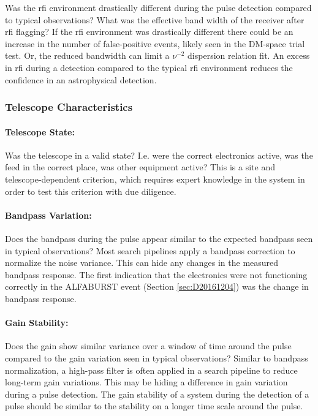 \documentclass[a4paper,fleqn,usenatbib]{mnras}
\begin{document}
Was the \gls{rfi} environment drastically different during the pulse detection
compared to typical observations? What was the effective band width of the
receiver after \gls{rfi} flagging? If the \gls{rfi} environment was drastically
different there could be an increase in the number of false-positive events,
likely seen in the DM-space trial test. Or, the reduced bandwidth can limit a
$\nu^{-2}$ dispersion relation fit. An excess in \gls{rfi} during a detection
compared to the typical \gls{rfi} environment reduces the confidence in an
astrophysical detection.

\subsubsection{Telescope Characteristics}

\paragraph{Telescope State:}

Was the telescope in a valid state? I.e. were the correct electronics active,
was the feed in the correct place, was other equipment active? This is a site
and telescope-dependent criterion, which requires expert knowledge in the
system in order to test this criterion with due diligence.

\paragraph{Bandpass Variation:}

Does the bandpass during the pulse appear similar to the expected bandpass seen
in typical observations? Most search pipelines apply a bandpass correction to
normalize the noise variance. This can hide any changes in the measured bandpass
response. The first indication that the electronics were not functioning
correctly in the ALFABURST event (Section \ref{sec:D20161204}) was the change in
bandpass response.

\paragraph{Gain Stability:}

Does the gain show similar variance over a window of time around the pulse
compared to the gain variation seen in typical observations? Similar to bandpass
normalization, a high-pass filter is often applied in a search pipeline to
reduce long-term gain variations. This may be hiding a difference in gain
variation during a pulse detection. The gain stability of a system during the
detection of a pulse should be similar to the stability on a longer time scale
around the pulse.
\end{document}
